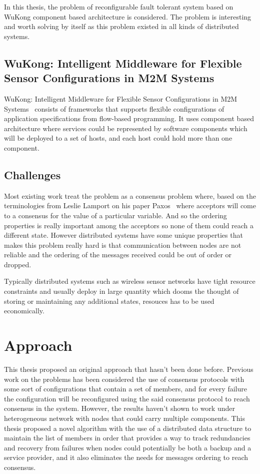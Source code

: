 In this thesis, the problem of reconfigurable fault tolerant system based on
WuKong component based architecture is considered. The problem is
interesting and worth solving by itself as this problem existed in all
kinds of distributed systems.

\subsection{WuKong: Intelligent Middleware for Flexible Sensor Configurations in
  M2M Systems}

WuKong: Intelligent Middleware for Flexible Sensor Configurations in M2M
Systems~\cite{Reijers} consists of frameworks that supports flexible
configurations of application specifications from flow-based programming.
It uses component based architecture where services could be represented by
software components which will be deployed to a set of hosts, and each host
could hold more than one component.

\subsection{Challenges}

Most existing work treat the problem as a consensus problem where, based on the
terminologies from Leslie Lamport on his paper Paxos~\cite{Lamport2001}
where acceptors will come to a consensus for the value of a particular
variable. And so the ordering properties is really important among the
acceptors so none of them could reach a different state. However distributed
systems have some unique properties that makes this problem really hard is that
communication between nodes are not reliable and the ordering of the messages
received could be out of order or dropped.

Typically distributed systems such as wireless sensor networks have tight
resource constraints and usually deploy in large quantity which
dooms the thought of storing or maintaining any additional states, resouces has
to be used economically.

\section{Approach}

This thesis proposed an original approach that hasn't been done before.
Previous work on the problems has been considered the use of consensus
protocols with some sort of configurations that contain a set of members, and
for every failure the configuration will be reconfigured using the said
consensus protocol to reach consensus in the system. However, the results
haven't shown to work under heterogeneous network with nodes that could carry
multiple components. This thesis proposed a novel algorithm with the use of
a distributed data structure to maintain the list of members in order that
provides a way to track redundancies and recovery from failures when nodes
could potentially be both a backup and a service provider, and it also
eliminates the needs for messages ordering to reach consensus.

